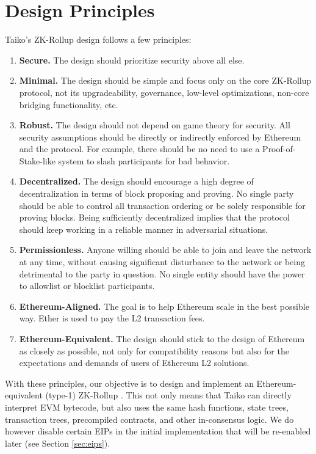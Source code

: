 \section{Design Principles}

Taiko's ZK-Rollup design follows a few principles:

\begin{enumerate}
\item \textbf{Secure.} The design should prioritize security above all else.
\item \textbf{Minimal.} The design should be simple and focus only on the core ZK-Rollup protocol, not its upgradeability, governance, low-level optimizations, non-core bridging functionality, etc.
\item  \textbf{Robust.} The design should not depend on game theory for security. All security assumptions should be directly or indirectly enforced by Ethereum and the protocol. For example, there should be no need to use a Proof-of-Stake-like system to slash participants for bad behavior.
\item \textbf{Decentralized.} The design should encourage a high degree of decentralization in terms of block proposing and proving. No single party should be able to control all transaction ordering or be solely responsible for proving blocks. Being sufficiently decentralized implies that the protocol should keep working in a reliable manner in adversarial situations.
\item \textbf{Permissionless.} Anyone willing should be able to join and leave the network at any time, without causing significant disturbance to the network or being detrimental to the party in question. No single entity should have the power to allowlist or blocklist participants.
\item \textbf{Ethereum-Aligned.} The goal is to help Ethereum scale in the best possible way. Ether is used to pay the L2 transaction fees.
\item \textbf{Ethereum-Equivalent.} The design should stick to the design of Ethereum as closely as possible, not only for compatibility reasons but also for the expectations and demands of users of Ethereum L2 solutions.
\end{enumerate}

With these principles, our objective is to design and implement an Ethereum-equivalent (type-1) ZK-Rollup \cite{vitalik-zkevm}. This not only means that Taiko can directly interpret EVM bytecode, but also uses the same hash functions, state trees, transaction trees, precompiled contracts, and other in-consensus logic. We do however disable certain EIPs in the initial implementation\cite{taikoprotogithub} that will be re-enabled later (see Section \ref{sec:eips}).
